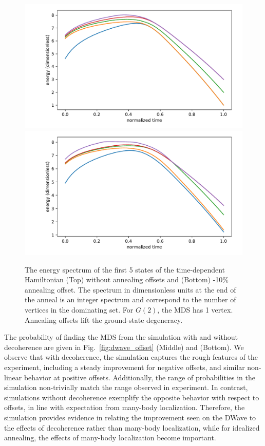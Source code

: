 \documentclass[prd,twocolumn,tightenlines,preprintnumbers,showpacs,superscriptaddress,notitlepage,nofootinbib,eqsecnum,floatfix,longbibliography]{revtex4}
\begin{document}
\begin{figure}
	\centering
	\includegraphics[width=\columnwidth]{./figures/spectrum.pdf}
	\includegraphics[width=\columnwidth]{./figures/spectrum_offset.pdf}
	\caption{The energy spectrum of the first 5 states of the time-dependent Hamiltonian (Top) without annealing offsets and (Bottom) -10\% annealing offset. The spectrum in dimensionless units at the end of the anneal is an integer spectrum and correspond to the number of vertices in the dominating set. For $G(2)$, the MDS has 1 vertex. Annealing offsets lift the ground-state degeneracy.}
	\label{fig:spectrum}
\end{figure}

The probability of finding the MDS from the simulation with and without decoherence are given in Fig.~\ref{fig:dwave_offset} (Middle) and (Bottom). We observe that with decoherence, the simulation captures the rough features of the experiment, including a steady improvement for negative offsets, and similar non-linear behavior at positive offsets. Additionally, the range of probabilities in the simulation non-trivially match the range observed in experiment. In contrast, simulations without decoherence exemplify the opposite behavior with respect to offsets, in line with expectation from many-body localization. Therefore, the simulation provides evidence in relating the improvement seen on the DWave to the effects of decoherence rather than many-body localization, while for idealized annealing, the effects of many-body localization become important.
\end{document}
